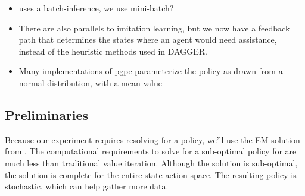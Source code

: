 \begin{itemize}
         \item \cite{doshi2016hidden} uses a batch-inference, we use mini-batch?

         \item There are also parallels to imitation learning, but we now have a feedback path that determines the states where an
         agent would need assistance, instead of the heuristic methods used in DAGGER.

         \item Many implementations of \ac{pgpe} parameterize the policy as drawn from a normal distribution, with a mean value

    \end{itemize}

\subsection{Preliminaries}\label{sec:preliminaries}
Because our experiment requires resolving for a policy, we'll use the \ac{EM} solution from
\cite{toussaint2010expectation}. The computational requirements to solve for a sub-optimal policy for  are
much less than traditional value iteration. Although the solution is sub-optimal, the solution is complete for the
entire state-action-space. The resulting policy is stochastic, which can help gather more data.
